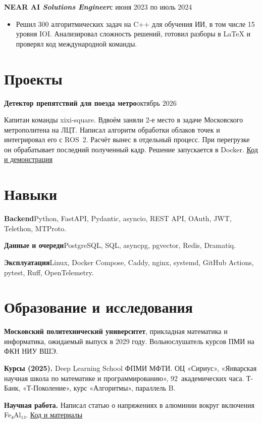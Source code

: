 \documentclass[10pt,a4paper]{article}
\newcommand{\role}[2]{\textbf{#1}\hfill{\small #2}\par}
\begin{document}
\vspace{3pt}
\role{NEAR AI \normalfont\textit{Solutions Engineer}}{с июня 2023 по июль 2024}
\begin{itemize}
  \item Решил 300 алгоритмических задач на C++ для обучения ИИ, в том числе 15 уровня IOI. Анализировал сложность решений, готовил разборы в LaTeX и проверял код международной команды.
\end{itemize}

\section{Проекты}
\role{Детектор препятствий для поезда метро}{октябрь 2026}
Капитан команды xixi-square. Вдвоём заняли 2-е место в задаче Московского метрополитена на ЛЦТ. Написал алгоритм обработки облаков точек и интегрировал его с ROS~2. Расчёт вынес в отдельный процесс. При перегрузке он обрабатывает последний полученный кадр. Решение запускается в Docker. \href{https://github.com/iluuua/metro-lidar-obstacle-detection}{\underline{Код и демонстрация}}

\section{Навыки}
\textbf{Backend}\quad Python, FastAPI, Pydantic, asyncio, REST API, OAuth, JWT, Telethon, MTProto.\par
\textbf{Данные и очереди}\quad PostgreSQL, SQL, asyncpg, pgvector, Redis, Dramatiq.\par
\textbf{Эксплуатация}\quad Linux, Docker Compose, Caddy, nginx, systemd, GitHub Actions, pytest, Ruff, OpenTelemetry.\par

\section{Образование и исследования}
\textbf{Московский политехнический университет}, прикладная математика и информатика, ожидаемый выпуск в 2029 году. Вольнослушатель курсов ПМИ на ФКН НИУ ВШЭ.\par
\textbf{Курсы (2025).} Deep Learning School ФПМИ МФТИ. ОЦ «Сириус», «Январская научная школа по математике и программированию», 92~академических часа. Т-Банк, «Т-Поколение», курс «Алгоритмы», параллель B.\par
\textbf{Научная работа.} Написал статью о напряжениях в алюминии вокруг включения Fe₄Al₁₃. \href{https://github.com/iluuua/magnetostriction-plasticity-bounds}{\underline{Код и материалы}}
\end{document}

